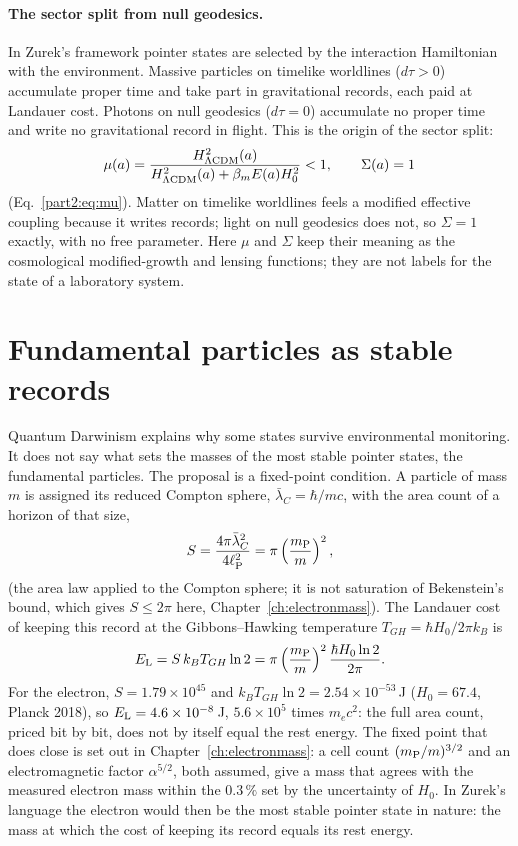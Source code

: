 \paragraph{The sector split from null geodesics.} In Zurek's framework pointer states are selected by the interaction Hamiltonian with the environment.
Massive particles on timelike worldlines ($d\tau>0$) accumulate proper time and take part in gravitational records, each paid at Landauer cost. Photons
on null geodesics ($d\tau=0$) accumulate no proper time and write no gravitational record in flight. This is the origin of the sector split:
\begin{equation}
\mu(a)=\frac{H^2_{\Lambda{\rm CDM}}(a)}{H^2_{\Lambda{\rm CDM}}(a)+\beta_mE(a)H_0^2}<1,\qquad\Sigma(a)=1\label{eq:qr_mu}
\end{equation}
(Eq.~\ref{part2:eq:mu}). \derived{} Matter on timelike worldlines feels a modified effective coupling because it writes records; light on null geodesics
does not, so $\Sigma=1$ exactly, with no free parameter. Here $\mu$ and $\Sigma$ keep their meaning as the cosmological modified-growth and lensing
functions; they are not labels for the state of a laboratory system.

\section{Fundamental particles as stable records}\label{sec:qr_particles}
Quantum Darwinism explains why some states survive environmental monitoring. It does not say what sets the masses of the most stable pointer states, the
fundamental particles. The proposal is a fixed-point condition. A particle of mass $m$ is assigned its reduced Compton sphere, $\bar\lambda_C=\hbar/mc$,
with the area count of a horizon of that size,
\begin{equation}
S=\frac{4\pi\bar\lambda_C^2}{4\ell_{\mathrm P}^2}=\pi\left(\frac{m_{\mathrm P}}{m}\right)^2 ,\label{eq:qr_Scompton}
\end{equation}
\conjecture{} (the area law applied to the Compton sphere; it is not saturation of Bekenstein's bound, which gives $S\le2\pi$ here,
Chapter~\ref{ch:electronmass}). The Landauer cost of keeping this record at the Gibbons--Hawking temperature $T_{GH}=\hbar H_0/2\pi k_B$ is
\begin{equation}
E_{\rm L}=S\,k_BT_{GH}\ln2=\pi\left(\frac{m_{\mathrm P}}{m}\right)^2\frac{\hbar H_0\ln2}{2\pi}.\label{eq:qr_ELcompton}
\end{equation}
\calc{} For the electron, $S=1.79\times10^{45}$ and $k_BT_{GH}\ln2=2.54\times10^{-53}$\,J ($H_0=67.4$, Planck 2018), so $E_{\rm L}=4.6\times10^{-8}$\,J, $5.6\times10^5$
times $m_ec^2$: the full area count, priced bit by bit, does not by itself equal the rest energy. \calc{} The fixed point that does close is set out in
Chapter~\ref{ch:electronmass}: a cell count $(m_{\mathrm P}/m)^{3/2}$ and an electromagnetic factor $\alpha^{5/2}$, both assumed, give a mass that agrees with the
measured electron mass within the $0.3\,\%$ set by the uncertainty of $H_0$. \conjecture{} In Zurek's language the electron would then be the most stable
pointer state in nature: the mass at which the cost of keeping its record equals its rest energy. \interp

